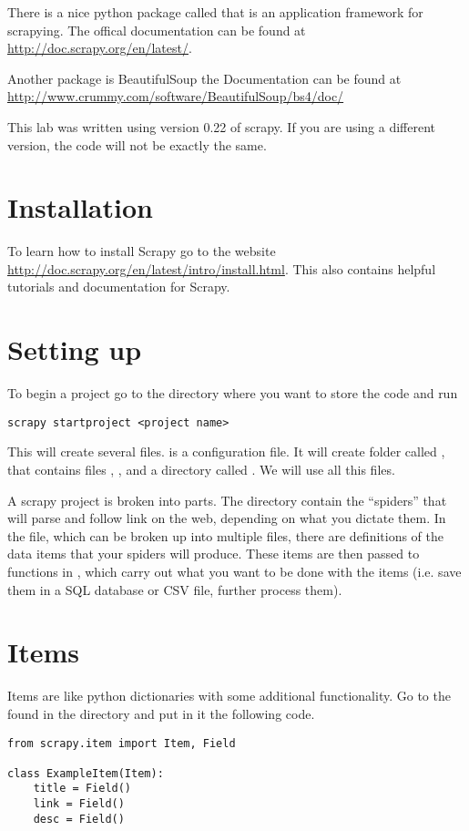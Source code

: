 There is a nice python package called  that is an application framework for scrapying.
The offical documentation can be found at \url{http://doc.scrapy.org/en/latest/}. 

Another package is BeautifulSoup the Documentation can be found at \url{http://www.crummy.com/software/BeautifulSoup/bs4/doc/}

\begin{warn}
This lab was written using version 0.22 of scrapy. 
If you are using a different version, the code will not be exactly the same.
\end{warn}

\section*{Installation}

To learn how to install Scrapy go to the website \url{http://doc.scrapy.org/en/latest/intro/install.html}. 
This also contains helpful tutorials and documentation for Scrapy.

\section*{Setting up}
To begin a project go to the directory where you want to store the code and run
\begin{lstlisting}
scrapy startproject <project name>
\end{lstlisting}
This will create several files.  is a configuration file. 
It will create folder called  , that contains files , ,  and a directory called . 
We will use all this files.

A scrapy project is broken into parts. 
The  directory contain the ``spiders'' that will parse and follow link on the web, depending on what you dictate them.
In the  file, which can be broken up into multiple files, there are definitions of the data items that your spiders will produce. 
These items are then passed to functions in , which carry out what you want to be done with the items (i.e. save them in a SQL database or CSV file, further process them).

\section*{Items}
Items are like python dictionaries with some additional functionality. 
Go to the  found in the  directory and put in it the following code.
\begin{lstlisting}
from scrapy.item import Item, Field

class ExampleItem(Item):
    title = Field()
    link = Field()
    desc = Field()
\end{lstlisting}


